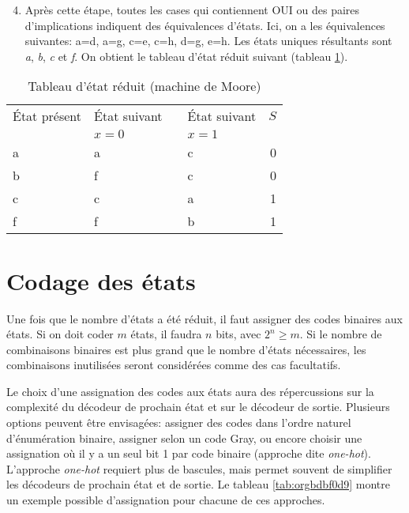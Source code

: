\documentclass[letter, oneside]{book}
\begin{document}
\begin{enumerate}
\begin{enumerate}
\setcounter{enumi}{3}
\item Après cette étape, toutes les  cases qui contiennent OUI ou des
paires d'implications indiquent des équivalences d'états. Ici, on a
les équivalences suivantes: a=d, a=g, c=e, c=h, d=g, e=h. Les états
uniques résultants sont \emph{a}, \emph{b}, \emph{c} et \emph{f}. On obtient le tableau
d'état réduit suivant (tableau \ref{tab:org9d1b7a6}).
\end{enumerate}

\begin{table}[htbp]
\caption{\label{tab:org9d1b7a6}Tableau d'état réduit (machine de Moore)}
\centering
\begin{tabular}{llllr}
État présent & État suivant &  & État suivant & \(S\)\\[0pt]
 & \(x=0\) &  & \(x=1\) & \\[0pt]
\hline
a & a &  & c & 0\\[0pt]
b & f &  & c & 0\\[0pt]
c & c &  & a & 1\\[0pt]
f & f &  & b & 1\\[0pt]
\end{tabular}
\end{table}
\end{enumerate}


\section{Codage des états}
\label{sec:org7f6c5e1}

Une fois que le nombre d'états a été réduit, il faut assigner des
codes binaires aux états. Si on doit coder \(m\) états, il faudra
\(n\) bits, avec \(2^n \geq m\). Si le nombre de combinaisons
binaires est plus grand que le nombre d'états nécessaires, les
combinaisons inutilisées seront considérées comme des cas facultatifs.

Le choix d'une assignation des codes aux états aura des répercussions
sur la complexité du décodeur de prochain état et sur le décodeur de
sortie. Plusieurs options peuvent être envisagées: assigner des codes
dans l'ordre naturel d'énumération binaire, assigner selon un code
Gray, ou encore choisir une assignation où il y a un seul bit 1 par
code binaire (approche dite \emph{one-hot}). L'approche \emph{one-hot} requiert
plus de bascules, mais permet souvent de simplifier les décodeurs de
prochain état et de sortie. Le tableau \ref{tab:orgbdbf0d9} montre
un exemple possible d'assignation pour chacune de ces approches.
\end{document}

